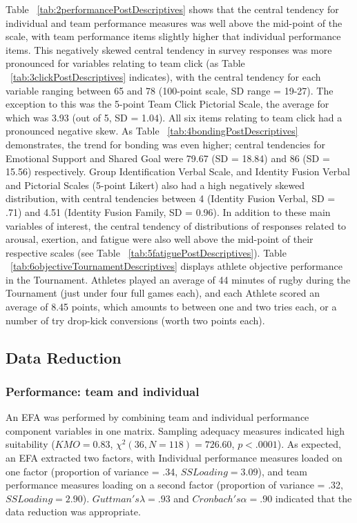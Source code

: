 Table ~\ref{tab:2performancePostDescriptives} shows that the central tendency for individual and team performance measures was well above the mid-point of the scale, with team performance items slightly higher that individual performance items.  This negatively skewed central tendency in survey responses was more pronounced for variables relating to team click (as Table ~\ref{tab:3clickPostDescriptives} indicates), with the central tendency for each variable ranging between 65 and 78 (100-point scale, SD range = 19-27). The exception to this was the 5-point Team Click Pictorial Scale, the average for which was 3.93 (out of 5, SD = 1.04).  All six items relating to team click had a pronounced negative skew.  As Table ~\ref{tab:4bondingPostDescriptives} demonstrates, the trend for bonding was even higher; central tendencies for Emotional Support and Shared Goal were 79.67 (SD = 18.84) and 86 (SD = 15.56) respectively.  Group Identification Verbal Scale, and Identity Fusion Verbal and Pictorial Scales (5-point Likert) also had a high negatively skewed distribution, with central tendencies between 4 (Identity Fusion Verbal, SD = .71) and 4.51 (Identity Fusion Family, SD = 0.96).
In addition to these main variables of interest, the central tendency of distributions of responses related to arousal, exertion, and fatigue were also well above the mid-point of their respective scales (see Table ~\ref{tab:5fatiguePostDescriptives}).  Table ~\ref{tab:6objectiveTournamentDescriptives} displays athlete objective performance in the Tournament. Athletes played an average of 44 minutes of rugby during the Tournament (just under four full games each), and each Athlete scored an average of 8.45 points, which amounts to between one and two tries each, or a number of try drop-kick conversions (worth two points each).








\subsection{Data Reduction}


\subsubsection{Performance: team and individual\label{app8:performanceDataReduction}}

An EFA was performed by combining team and individual performance component variables in one matrix.  Sampling adequacy measures indicated high suitability ($KMO = 0.83$, $\chi^2(36, N = 118) = 726.60$, $p < .0001$).  As expected, an EFA extracted two factors, with Individual performance measures loaded on one factor (proportion of variance = .34, $SS Loading = 3.09$), and team performance measures loading on a second factor (proportion of variance = .32, $SS Loading = 2.90$). $Guttman's \lambda =.93$ and $Cronbach's \alpha = .90$ indicated that the data reduction was appropriate.

